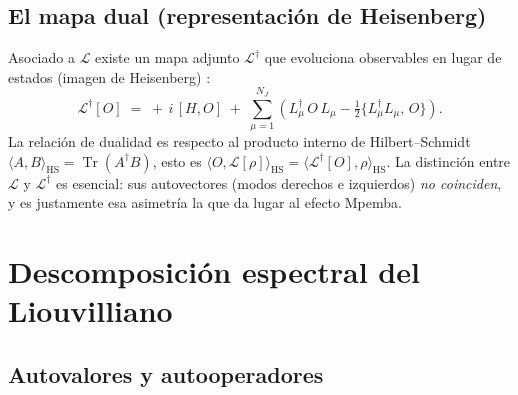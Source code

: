 \documentclass[11pt,a4paper]{article}
\theoremstyle{definition}
\theoremstyle{plain}
\newcommand{\Lop}{\mathcal{L}}
\newcommand{\Ldual}{\mathcal{L}^{\dagger}}
\renewcommand{\Tr}{\operatorname{Tr}}
\begin{document}
\subsection{El mapa dual (representación de Heisenberg)}

Asociado a $\Lop$ existe un mapa adjunto $\Ldual$ que evoluciona observables en lugar de estados
(imagen de Heisenberg) \cite{Carollo2021,LiYang2026}:
\begin{equation}
\Ldual[O]\;=\;+\,i\,[H,O]\;+\;\sum_{\mu=1}^{N_J}\!\left( L_\mu^{\dagger}\,O\,L_\mu
-\tfrac12\big\{L_\mu^{\dagger}L_\mu,\,O\big\}\right).
\label{eq:dual}
\end{equation}
La relación de dualidad es respecto al producto interno de Hilbert--Schmidt
$\langle A,B\rangle_{\mathrm{HS}}=\Tr(A^{\dagger}B)$, esto es
$\langle O,\Lop[\rho]\rangle_{\mathrm{HS}}=\langle \Ldual[O],\rho\rangle_{\mathrm{HS}}$.
La distinción entre $\Lop$ y $\Ldual$ es esencial: sus autovectores (modos derechos e izquierdos)
\emph{no coinciden}, y es justamente esa asimetría la que da lugar al efecto Mpemba.

\section{Descomposición espectral del Liouvilliano}

\subsection{Autovalores y autooperadores}
\end{document}
